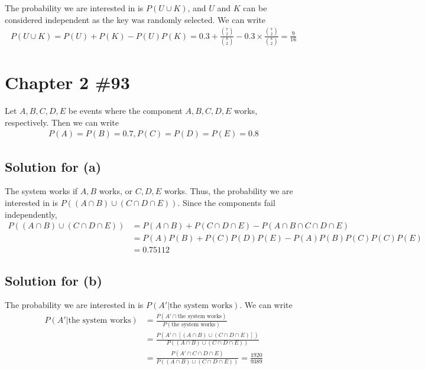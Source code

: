 \documentclass{scrartcl}
\begin{document}
The probability we are interested in is \(P(U \cup K)\), and \(U\) and \(K\)
can be considered independent as the key was randomly selected. We can write
\begin{align*}
  P(U \cup K)
  = P(U) + P(K) - P(U)P(K)
  = 0.3 + \frac{{7 \choose 2}}{{8 \choose 2}} - 0.3 \times \frac{{7 \choose 2}}{{8 \choose 2}}
  = \frac{9}{16}
\end{align*}

\section{Chapter 2 \#93}
Let \(A, B, C, D, E\) be events where the component \(A, B, C, D, E\) works,
respectively. Then we can write
\begin{align*}
  P(A) = P(B) = 0.7, P(C) = P(D) = P(E) = 0.8
\end{align*}

\subsection{Solution for (a)}
The system works if \(A, B\) works, or \(C, D, E\) works. Thus, the probability
we are interested in is \(P((A \cap B) \cup (C \cap D \cap E))\). Since the
components fail independently,
\begin{align*}
  P((A \cap B) \cup (C \cap D \cap E))
  &= P(A \cap B) + P(C \cap D \cap E) - P(A \cap B \cap C \cap D \cap E) \\
  &= P(A)P(B) + P(C)P(D)P(E) - P(A)P(B)P(C)P(C)P(E) \\
  &= 0.75112
\end{align*}

\subsection{Solution for (b)}
The probability we are interested in is \(P(A' | \text{the system works})\).
We can write
\begin{align*}
  P(A' | \text{the system works})
  &= \frac{P(A' \cap \text{the system works})}{P(\text{the system works})} \\
  &= \frac{P(A' \cap [(A \cap B) \cup (C \cap D \cap E)])}{P((A \cap B) \cup (C \cap D \cap E))} \\
  &= \frac{P(A' \cap C \cap D \cap E)}{P((A \cap B) \cup (C \cap D \cap E))}
  = \frac{1920}{9389}
\end{align*}
\end{document}
